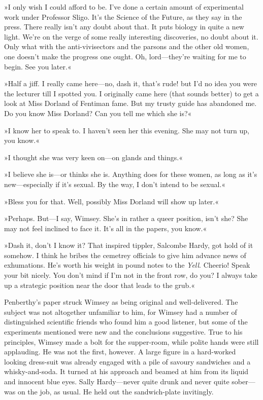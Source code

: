 »I only wish I could afford to be. I've done a certain amount of experimental work under Professor Sligo. It's the Science of the Future, as they say in the press. There really isn't any doubt about that. It puts biology in quite a new light. We're on the verge of some really interesting discoveries, no doubt about it. Only what with the anti-vivisectors and the parsons and the other old women, one doesn't make the progress one ought. Oh, lord—they're waiting for me to begin. See you later.«

»Half a jiff. I really came here—no, dash it, that's rude! but I'd no idea you were the lecturer till I spotted you. I originally came here (that sounds better) to get a look at Miss Dorland of Fentiman fame. But my trusty guide has abandoned me. Do you know Miss Dorland? Can you tell me which she is?«

»I know her to speak to. I haven't seen her this evening. She may not turn up, you know.«

»I thought she was very keen on—on glands and things.«

»I believe she is—or thinks she is. Anything does for these women, as long as it's new—especially if it's sexual. By the way, I don't intend to be sexual.«

»Bless you for that. Well, possibly Miss Dorland will show up later.«

»Perhaps. But—I say, Wimsey. She's in rather a queer position, isn't she? She may not feel inclined to face it. It's all in the papers, you know.«

»Dash it, don't I know it? That inspired tippler, Salcombe Hardy, got hold of it somehow. I think he bribes the cemetrey officials to give him advance news of exhumations. He's worth his weight in pound notes to the \textit{Yell}. Cheerio! Speak your bit nicely. You don't mind if I'm not in the front row, do you? I always take up a strategic position near the door that leads to the grub.«

Penberthy's paper struck Wimsey as being original and well-delivered. The subject was not altogether unfamiliar to him, for Wimsey had a number of distinguished scientific friends who found him a good listener, but some of the experiments mentioned were new and the conclusions suggestive. True to his principles, Wimsey made a bolt for the supper-room, while polite hands were still applauding. He was not the first, however. A large figure in a hard-worked looking dress-suit was already engaged with a pile of savoury sandwiches and a whisky-and-soda. It turned at his approach and beamed at him from its liquid and innocent blue eyes. Sally Hardy—never quite drunk and never quite sober—was on the job, as usual. He held out the sandwich-plate invitingly.

